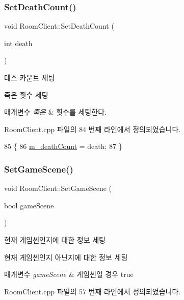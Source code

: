 \subsubsection{\texorpdfstring{Set\+Death\+Count()}{SetDeathCount()}}
{\footnotesize\ttfamily void Room\+Client\+::\+Set\+Death\+Count (\begin{DoxyParamCaption}\item[{int}]{death }\end{DoxyParamCaption})}



데스 카운트 세팅 

죽은 횟수 세팅


\begin{DoxyParams}{매개변수}
{\em 죽은} & 횟수를 세팅한다. \\
\hline
\end{DoxyParams}


Room\+Client.\+cpp 파일의 84 번째 라인에서 정의되었습니다.


\begin{DoxyCode}
85 \{
86     \hyperlink{class_room_client_a4427d3725926876237d44ae4b088c57f}{m\_deathCount} = death;
87 \}
\end{DoxyCode}
\mbox{\label{class_room_client_aa16788473bcf0c328d6ac3b1f269cfe6}} 
\subsubsection{\texorpdfstring{Set\+Game\+Scene()}{SetGameScene()}}
{\footnotesize\ttfamily void Room\+Client\+::\+Set\+Game\+Scene (\begin{DoxyParamCaption}\item[{bool}]{game\+Scene }\end{DoxyParamCaption})}



현재 게임씬인지에 대한 정보 세팅 

현재 게임씬인지 아닌지에 대한 정보 세팅


\begin{DoxyParams}{매개변수}
{\em game\+Scene} & 게임씬일 경우 true \\
\hline
\end{DoxyParams}


Room\+Client.\+cpp 파일의 57 번째 라인에서 정의되었습니다.


